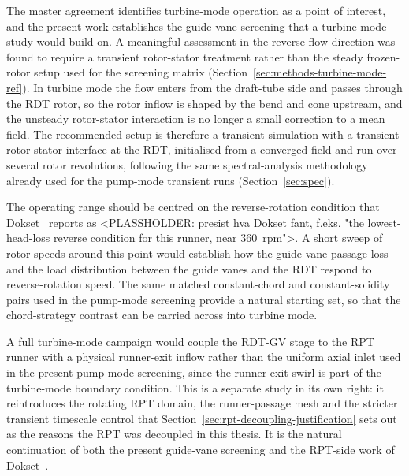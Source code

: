 The master agreement identifies turbine-mode operation as a point of interest,
and the present work establishes the guide-vane screening that a turbine-mode
study would build on. A meaningful assessment in the reverse-flow direction was
found to require a transient rotor-stator treatment rather than the steady
frozen-rotor setup used for the screening matrix
(Section~\ref{sec:methods-turbine-mode-ref}). In turbine mode the flow enters
from the draft-tube side and passes through the RDT rotor, so the rotor inflow
is shaped by the bend and cone upstream, and the unsteady rotor-stator
interaction is no longer a small correction to a mean field. The recommended
setup is therefore a transient simulation with a transient rotor-stator
interface at the RDT, initialised from a converged field and run over several
rotor revolutions, following the same spectral-analysis methodology already
used for the pump-mode transient runs (Section~\ref{sec:spec}).

The operating range should be centred on the reverse-rotation condition that
Dokset~\cite{Dokset2026} reports as <PLASSHOLDER: presist hva Dokset fant, f.eks.
"the lowest-head-loss reverse condition for this runner, near 360~rpm">. A
short sweep of rotor speeds around this point would establish how the guide-vane
passage loss and the load distribution between the guide vanes and the RDT
respond to reverse-rotation speed. The same matched constant-chord and
constant-solidity pairs used in the pump-mode screening provide a natural
starting set, so that the chord-strategy contrast can be carried across into
turbine mode.

A full turbine-mode campaign would couple the RDT-GV stage to the RPT runner
with a physical runner-exit inflow rather than the uniform axial inlet used in
the present pump-mode screening, since the runner-exit swirl is part of the
turbine-mode boundary condition. This is a separate study in its own right: it
reintroduces the rotating RPT domain, the runner-passage mesh and the stricter
transient timescale control that Section~\ref{sec:rpt-decoupling-justification}
sets out as the reasons the RPT was decoupled in this thesis. It is the natural
continuation of both the present guide-vane screening and the RPT-side work of
Dokset~\cite{Dokset2026}.
\clearpage %